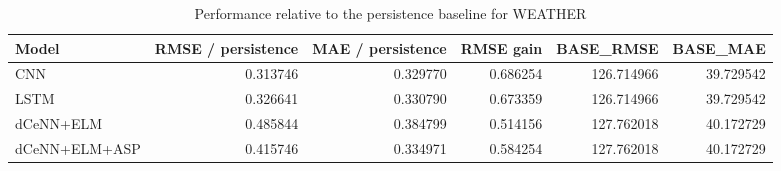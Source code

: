 \begin{table}
\caption{Performance relative to the persistence baseline for WEATHER}
\begin{tabular}{lrrrrr}
\toprule
Model & RMSE / persistence & MAE / persistence & RMSE gain & BASE\_RMSE & BASE\_MAE \\
\midrule
CNN & 0.313746 & 0.329770 & 0.686254 & 126.714966 & 39.729542 \\
LSTM & 0.326641 & 0.330790 & 0.673359 & 126.714966 & 39.729542 \\
dCeNN+ELM & 0.485844 & 0.384799 & 0.514156 & 127.762018 & 40.172729 \\
dCeNN+ELM+ASP & 0.415746 & 0.334971 & 0.584254 & 127.762018 & 40.172729 \\
\bottomrule
\end{tabular}
\end{table}

